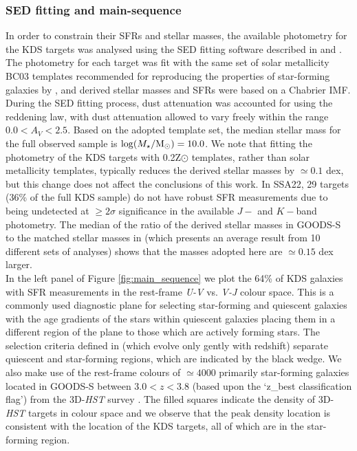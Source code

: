 \documentclass[fleqn,usenatbib]{mn2e}
\begin{document}
\subsubsection{SED fitting and main-sequence}\label{subsubsec:sed_fitting}
In order to constrain their SFRs and stellar masses, the available photometry for the KDS targets was analysed using the SED fitting software described in \cite{McLure2011} and \cite{McLeod2015}.
The photometry for each target was fit with the same set of solar metallicity BC03 \citep{Bruzual2003} templates recommended for reproducing the properties of star-forming galaxies by \cite{Wuyts2011a}, and derived stellar masses and SFRs were based on a Chabrier IMF.
During the SED fitting process, dust attenuation was accounted for using the \cite{Calzetti2000} reddening law, with dust attenuation allowed to vary freely within the range $0.0<A_{V}<2.5$.
Based on the adopted template set, the median stellar mass for the full observed sample is $\log(M_{\star}/{\rm M}_{\odot}) = 10.0$. 
We note that fitting the photometry of the KDS targets with 0.2Z$\odot$ templates, rather than solar metallicity templates, typically reduces the derived stellar masses by $\simeq0.1$ dex, but this change does not affect the conclusions of this work.
In SSA22, 29 targets (36\% of the full KDS sample) do not have robust SFR measurements due to being undetected at $\geq 2\sigma$ significance in the available $J-$ and $K-$band photometry.
The median of the ratio of the derived stellar masses in GOODS-S to the matched stellar masses in \cite{Santini2015} (which presents an average result from 10 different sets of analyses) shows that the masses adopted here are $\simeq0.15$ dex larger. \\

In the left panel of Figure \ref{fig:main_sequence} we plot the 64\% of KDS galaxies with SFR measurements in the rest-frame {\it U-V} vs. {\it V-J} colour space.
This is a commonly used diagnostic plane for selecting star-forming and quiescent galaxies \citep[e.g.][]{Williams2009,Brammer2011,Whitaker2012a} with the age gradients of the stars within quiescent galaxies placing them in a different region of the plane to those which are actively forming stars.
The selection criteria defined in \cite{Whitaker2012a} (which evolve only gently with redshift) separate quiescent and star-forming regions, which are indicated by the black wedge.
We also make use of the rest-frame colours of $\simeq4000$ primarily star-forming galaxies located in GOODS-S between $3.0 < z < 3.8$ (based upon the `z\_best classification flag') from the 3D-{\em HST} survey \citep{Brammer2012,Momcheva2016}.
The filled squares indicate the density of 3D-{\em HST} targets in colour space and we observe that the peak density location is consistent with the location of the KDS targets, all of which are in the star-forming region. 
\end{document}
